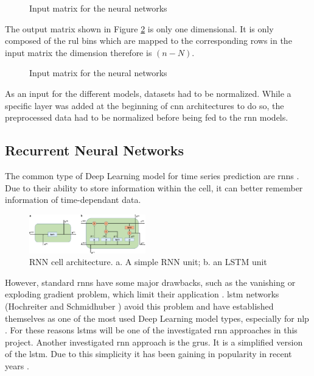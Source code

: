 \documentclass[conference]{IEEEtran}
\begin{document}
\begin{figure}[htp]
	\centering
	
	\caption{Input matrix for the neural networks}
	\label{fig:input_matrix}
\end{figure}

The output matrix shown in Figure \ref{fig:output_matrix} is only one dimensional. It is only composed of the \gls{rul} bins which are mapped to the corresponding rows in the input matrix the dimension therefore is $ (n-N) $.

\begin{figure}[htp]
	\centering
	
	\caption{Input matrix for the neural networks}
	\label{fig:output_matrix}
\end{figure}

As an input for the different models, datasets had to be normalized. While a specific layer was added at the beginning of \gls{cnn} architectures to do so, the preprocessed data had to be normalized before being fed to the \gls{rnn} models.


\subsection{Recurrent Neural Networks}
\label{sec:recurrent_neural_networks}

The common type of Deep Learning model for time series prediction are \glspl{rnn} \cite{Bai2018}. Due to their ability to store information within the cell, it can better remember information of time-dependant data. 


\begin{figure}[htp]
	\centering
	\includegraphics[width=0.45\textwidth]{RNN-cell-architecture.png}
	\caption{RNN cell architecture. a. A simple RNN unit; b. an LSTM unit \cite{Chen2021}}
	\label{fig:RNN-classification}
\end{figure}

However, standard \glspl{rnn} have some major drawbacks, such as the vanishing or exploding gradient problem, which limit their application \cite{Bengio1994}. \gls{lstm} networks (Hochreiter and Schmidhuber \cite{Hochreiter1997}) avoid this problem and have established themselves as one of the most used Deep Learning model types, especially for \gls{nlp} \cite{Wu2016}. For these reasons \glspl{lstm} will be one of the investigated \gls{rnn} approaches in this project. Another investigated \gls{rnn} approach is the \glspl{gru}. It is a simplified version of the \gls{lstm}. Due to this simplicity it has been gaining in popularity in recent years \cite{Rana2016}. 
\end{document}
